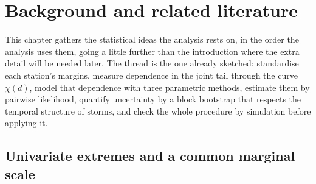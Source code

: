 %
%
%
\section{Background and related literature}\label{sec:literature}

This chapter gathers the statistical ideas the analysis rests on, in the order the analysis uses them, going a little further than the introduction where the extra detail will be needed later. The thread is the one already sketched: standardise each station's margins, measure dependence in the joint tail through the curve \(\chi(d)\), model that dependence with three parametric methods, estimate them by pairwise likelihood, quantify uncertainty by a block bootstrap that respects the temporal structure of storms, and check the whole procedure by simulation before applying it.

\subsection{Univariate extremes and a common marginal scale}\label{sec:lit-evt}\label{sec:lit-wind}

